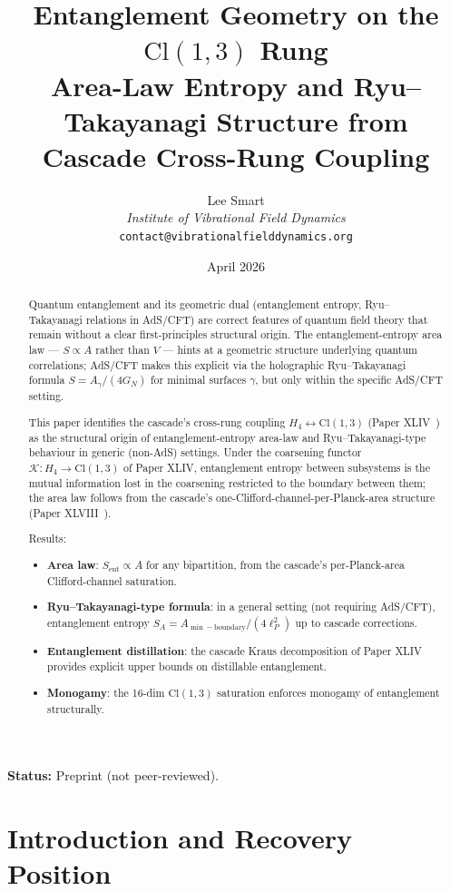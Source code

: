 \documentclass[12pt]{article}
\title{Entanglement Geometry on the $\mathrm{Cl}(1,3)$ Rung\\[6pt]
\large Area-Law Entropy and Ryu--Takayanagi Structure from Cascade Cross-Rung Coupling}
\author{Lee Smart\\ \textit{Institute of Vibrational Field Dynamics}\\ \texttt{contact@vibrationalfielddynamics.org}}
\date{April 2026}
\theoremstyle{remark}
\begin{document}
\maketitle

\noindent\textbf{Status:} Preprint (not peer-reviewed).

\begin{abstract}
Quantum entanglement and its geometric dual (entanglement entropy, Ryu--Takayanagi relations in AdS/CFT) are correct features of quantum field theory that remain without a clear first-principles structural origin. The entanglement-entropy area law --- $S \propto A$ rather than $V$ --- hints at a geometric structure underlying quantum correlations; AdS/CFT makes this explicit via the holographic Ryu--Takayanagi formula $S = A_\gamma / (4 G_N)$ for minimal surfaces $\gamma$, but only within the specific AdS/CFT setting.

This paper identifies the cascade's cross-rung coupling $H_4 \leftrightarrow \mathrm{Cl}(1,3)$ (Paper XLIV~\citep{SmartXLIV}) as the structural origin of entanglement-entropy area-law and Ryu--Takayanagi-type behaviour in generic (non-AdS) settings. Under the coarsening functor $\mathcal{K}: H_4 \to \mathrm{Cl}(1,3)$ of Paper XLIV, entanglement entropy between subsystems is the mutual information lost in the coarsening restricted to the boundary between them; the area law follows from the cascade's one-Clifford-channel-per-Planck-area structure (Paper XLVIII~\citep{SmartXLVIII}).

Results:
\begin{itemize}
\item \textbf{Area law}: $S_{\mathrm{ent}} \propto A$ for any bipartition, from the cascade's per-Planck-area Clifford-channel saturation.
\item \textbf{Ryu--Takayanagi-type formula}: in a general setting (not requiring AdS/CFT), entanglement entropy $S_A = A_{\min-\text{boundary}} / (4\ell_P^2)$ up to cascade corrections.
\item \textbf{Entanglement distillation}: the cascade Kraus decomposition of Paper XLIV provides explicit upper bounds on distillable entanglement.
\item \textbf{Monogamy}: the 16-dim $\mathrm{Cl}(1,3)$ saturation enforces monogamy of entanglement structurally.
\end{itemize}
\end{abstract}

\section{Introduction and Recovery Position}\label{sec:intro}
\end{document}
